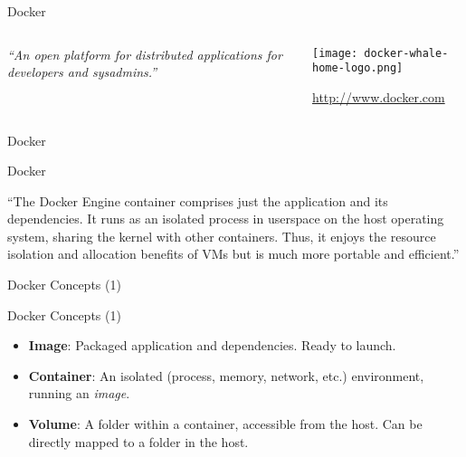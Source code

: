 \documentclass[presentation]{beamer}
\begin{document}
{
\begin{frame}[label=sec-4-1]{Docker}

\begin{columns}
\begin{column}{0.5\textwidth}

\textit{``An open platform for distributed applications for developers and sysadmins.''}
\end{column}

\begin{column}{0.5\textwidth}
\texttt{[image: docker-whale-home-logo.png]}

\url{http://www.docker.com}
\end{column}
\end{columns}
\end{frame}} %

{
\begin{frame}[label=sec-4-2]{Docker}

\begin{block}{Docker}

``The Docker Engine container comprises just the application and its dependencies. It runs as an isolated process in userspace on the host operating system, sharing the kernel with other containers. Thus, it enjoys the resource isolation and allocation benefits of VMs but is much more portable and efficient.''
\end{block}
\end{frame}} %

{
\begin{frame}[label=sec-4-3]{Docker Concepts (1)}

\begin{block}{Docker Concepts (1)}

\begin{itemize}
\item \textbf{Image}: Packaged application and dependencies. Ready to launch.
\item \textbf{Container}: An isolated (process, memory, network, etc.) environment, running an \textit{image}.
\item \textbf{Volume}: A folder within a container, accessible from the host. Can be directly mapped to a folder in the host.
\end{itemize}
\end{block}
\end{frame}} %
\end{document}
